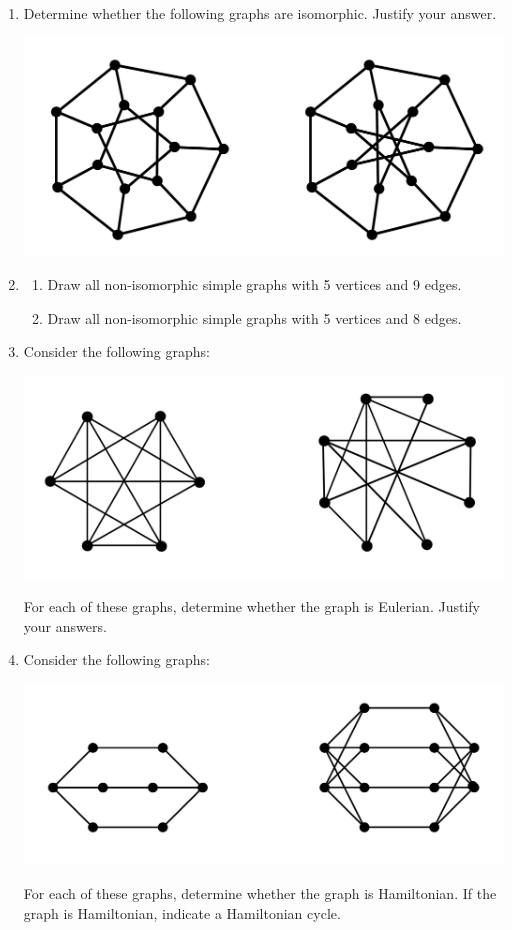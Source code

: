 \documentclass{article}
\begin{document}
\begin{enumerate}
	\item Determine whether the following graphs are isomorphic. Justify your answer.
	\begin{center}
	\includegraphics[width=.6\textwidth]{quiz-pic-1.png}
	\end{center}
	\item  
		\begin{enumerate}
			\item Draw all non-isomorphic simple graphs with 5 vertices and 9 edges. 
			\item Draw all non-isomorphic simple graphs with 5 vertices and 8 edges.
		\end{enumerate}

\pagebreak

	\item Consider the following graphs:
	\begin{center}
		\includegraphics[width=.6\textwidth]{quiz-pic-2.png}
	\end{center}
		For each of these graphs, determine whether the graph is Eulerian. Justify your answers.

	\item Consider the following graphs:
	\begin{center}	
		\includegraphics[width=.6\textwidth]{quiz-pic-3.png}
	\end{center}
		For each of these graphs, determine whether the graph is Hamiltonian. If the graph is Hamiltonian, indicate a Hamiltonian cycle.


\end{enumerate}
\end{document}
